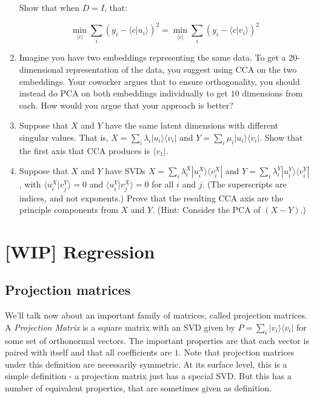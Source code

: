 \documentclass{amsbook}
\begin{document}
\begin{enumerate}
\noindent Show that when $D=I$, that:

$$
\min_{\langle c|}\sum_i \left(y_i-\langle c|u_{i}\rangle\right)^2 = \min_{\langle c|}\sum_i \left(y_i-\langle c|v_{i}\rangle\right)^2
$$
\item Imagine you have two embeddings representing the same data.  To get a $20$-dimensional representation of the data, you suggest using CCA on the two embeddings.  Your coworker argues that to ensure orthogonality, you should instead do PCA on both embeddings individually to get $10$ dimensions from each.  How would you argue that your approach is better?
\item Suppose that $X$ and $Y$ have the same latent dimensions with different singular values.  That is, $X=\sum_i\lambda_i|u_i\rangle\langle v_i|$ and $Y=\sum_i\mu_i|u_i\rangle\langle v_i|$.  Show that the first axis that CCA produces is $\langle v_1|$.
\item Suppose that $X$ and $Y$ have SVDs $X=\sum_i\lambda_i^X|u_i^X\rangle\langle v_i^X|$ and $Y=\sum_i\lambda_i^Y|u_i^Y\rangle\langle v_i^Y|$, with $\langle u_i^X|v_j^Y\rangle=0$ and $\langle u_i^Y|v_j^X\rangle=0$ for all $i$ and $j$.  (The superscripts are indices, and not exponents.)  Prove that the resulting CCA axis are the principle components from $X$ and $Y$.  (Hint: Consider the PCA of $(X-Y)$.)
\end{enumerate}

\chapter{[WIP] Regression}
\section{Projection matrices}

We'll talk now about an important family of matrices, called projection matrices.  A {\em Projection Matrix} is a square matrix with an SVD given by $P=\sum_i|v_i\rangle\langle v_i|$ for some set of orthonormal vectors.  The important properties are that each vector is paired with itself and that all coefficients are $1$.  Note that projection matrices under this definition are necessarily symmetric.  At its surface level, this is a simple definition - a projection matrix just has a special SVD.  But this has a number of equivalent properties, that are sometimes given as definition.
\end{document}
